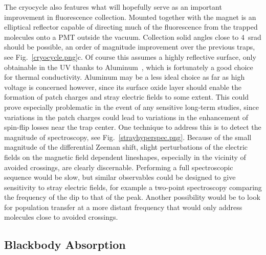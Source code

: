 \documentclass[defaultstyle,11pt]{thesis}
\begin{document}
The cryocycle also features what will hopefully serve as an important improvement in fluorescence collection.
Mounted together with the magnet is an elliptical reflector capable of directing much of the fluorescence from the trapped molecules onto a PMT outside the vacuum.
Collection solid angles close to $4$~srad should be possible, an order of magnitude improvement over the previous traps, see Fig.~\ref{cryocycle.png}c.
Of course this assumes a highly reflective surface, only obtainable in the UV thanks to Aluminum~\cite{}, which is fortunately a good choice for thermal conductivity.
Aluminum may be a less ideal choice as far as high voltage is concerned however, since its surface oxide layer should enable the formation of patch charges and stray electric fields to some extent.
This could prove especially problematic in the event of any sensitive long-term studies, since variations in the patch charges could lead to variations in the enhancement of spin-flip losses near the trap center.
One technique to address this is to detect the magnitude of spectroscopy, see Fig.~\ref{strayhyperspec.png}.
Because of the small magnitude of the differential Zeeman shift, slight perturbations of the electric fields on the magnetic field dependent lineshapes, especially in the vicinity of avoided crossings, are clearly discernable.
Performing a full spectroscopic sequence would be slow, but similar observables could be designed to give sensitivity to stray electric fields, for example a two-point spectroscopy comparing the frequency of the dip to that of the peak.
Another possibility would be to look for population transfer at a more distant frequency that would only address molecules close to avoided crossings.


\subsection{Blackbody Absorption}
\end{document}
